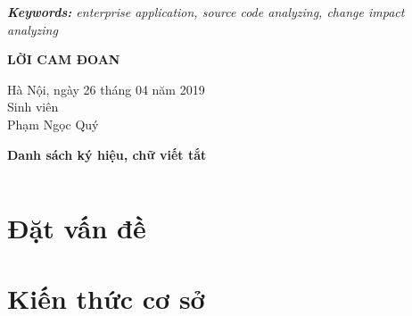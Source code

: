 \documentclass[12pt]{report}
\begin{document}
\noindent \textit{\textbf{Keywords:} enterprise application, source code analyzing, change impact analyzing}

\newpage
\begin{center}
	\textbf{\large LỜI CAM ĐOAN}
\end{center}


\begin{flushright}
	\begin{varwidth}{\linewidth}\centering
		Hà Nội, ngày 26 tháng 04 năm 2019\\
		Sinh viên\\[2cm]
		Phạm Ngọc Quý
	\end{varwidth}
\end{flushright}

\newpage
\tableofcontents

\newpage
{}
\listoftables

\newpage
{}
\begin{flushleft}
\bfseries{\Huge{Danh sách ký hiệu, chữ viết tắt}}
\end{flushleft}
\begin{table}[h]
	\centering
	\begin{tabular}{lll}
	
	\end{tabular}
\end{table}

\newpage
{}
\listoffigures

\newpage
{}
\setcounter{page}{1}
\chapter{Đặt vấn đề}
\chapter{Kiến thức cơ sở}
\end{document}
